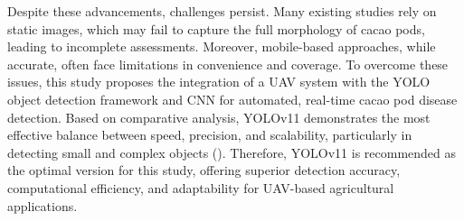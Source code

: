Despite these advancements, challenges persist. Many existing studies rely on static images, which may fail to capture the full morphology of cacao pods, leading to incomplete assessments. Moreover, mobile-based approaches, while accurate, often face limitations in convenience and coverage. To overcome these issues, this study proposes the integration of a UAV system with the YOLO object detection framework and CNN for automated, real-time cacao pod disease detection. Based on comparative analysis, YOLOv11 demonstrates the most effective balance between speed, precision, and scalability, particularly in detecting small and complex objects (\cite{UltralyticsBlog2025}). Therefore, YOLOv11 is recommended as the optimal version for this study, offering superior detection accuracy, computational efficiency, and adaptability for UAV-based agricultural applications.
